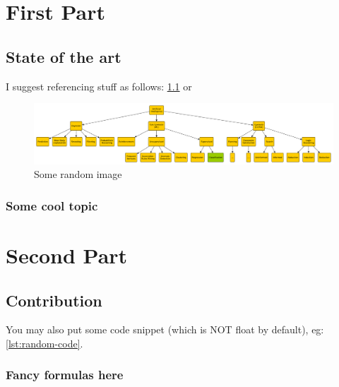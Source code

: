 \documentclass[12pt,a4paper,openright,twoside]{book}
\begin{document}
\part{First Part}

\chapter{State of the art}

I suggest referencing stuff as follows: \cref{fig:random-image} or 

\begin{figure}
    \centering
    \includegraphics[width=.8\linewidth]{figures/random-image.pdf}
    \caption{Some random image}
    \label{fig:random-image}
\end{figure}

\section{Some cool topic}

\part{Second Part}

\chapter{Contribution}

You may also put some code snippet (which is NOT float by default), eg: \cref{lst:random-code}.



\section{Fancy formulas here}


\backmatter

\part*{}

\nocite{*} %


\end{document}
